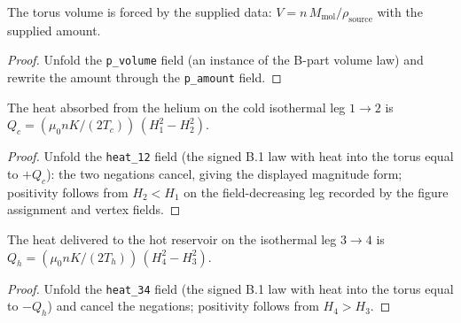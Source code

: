 \begin{lemma}
\label{lem:IPhO2026Problems_problem_IPhO_2026_3_C_3:torus_volume_value}
The torus volume is forced by the supplied data:
$V = n\,M_{\mathrm{mol}} / \rho_{\mathrm{source}}$ with the supplied amount.
\end{lemma}
\begin{proof}
Unfold the \texttt{p\_volume} field (an instance of the B-part volume law)
and rewrite the amount through the \texttt{p\_amount} field.
\end{proof}

\begin{lemma}
\label{lem:IPhO2026Problems_problem_IPhO_2026_3_C_3:Qc_cold_leg}
The heat absorbed from the helium on the cold isothermal leg $1 \to 2$ is
$Q_c = (\mu_0 n K / (2 T_c))\,(H_1^2 - H_2^2)$.
\end{lemma}
\begin{proof}
Unfold the \texttt{heat\_12} field (the signed B.1 law with heat into the
torus equal to $+Q_c$): the two negations cancel, giving the displayed
magnitude form; positivity follows from $H_2 < H_1$ on the field-decreasing
leg recorded by the figure assignment and vertex fields.
\end{proof}

\begin{lemma}
\label{lem:IPhO2026Problems_problem_IPhO_2026_3_C_3:Qh_hot_leg}
The heat delivered to the hot reservoir on the isothermal leg $3 \to 4$ is
$Q_h = (\mu_0 n K / (2 T_h))\,(H_4^2 - H_3^2)$.
\end{lemma}
\begin{proof}
Unfold the \texttt{heat\_34} field (the signed B.1 law with heat into the
torus equal to $-Q_h$) and cancel the negations; positivity follows from
$H_4 > H_3$.
\end{proof}

